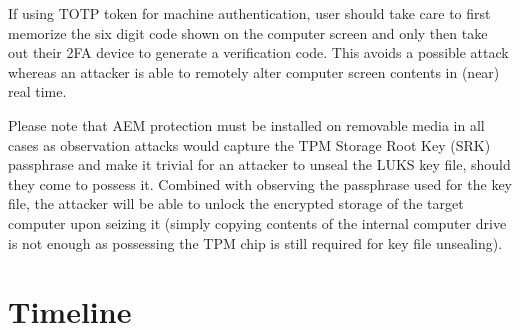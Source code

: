 \documentclass[10pt,a4paper,twocolumn]{article}
\begin{document}
If using TOTP token for machine authentication, user should take care to first
memorize the six digit code shown on the computer screen and only then take out
their 2FA device to generate a verification code. This avoids a possible attack
whereas an attacker is able to remotely alter computer screen contents in
(near) real time.

Please note that AEM protection must be installed on removable media in all
cases as observation attacks would capture the TPM Storage Root Key (SRK)
passphrase and make it trivial for an attacker to unseal the LUKS key file,
should they come to possess it. Combined with observing the passphrase used for
the key file, the attacker will be able to unlock the encrypted storage of the
target computer upon seizing it (simply copying contents of the internal
computer drive is not enough as possessing the TPM chip is still required for
key file unsealing).


\section{Timeline}
\end{document}
